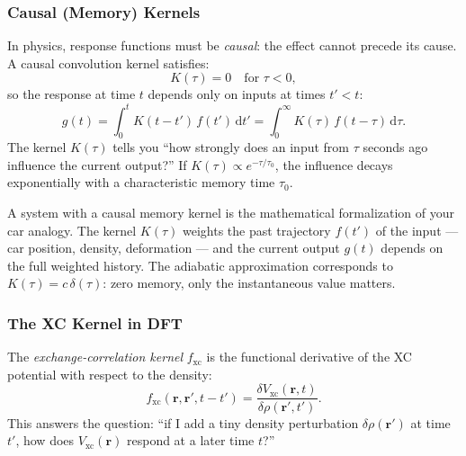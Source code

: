 \documentclass[12pt,letterpaper]{article}
\newcommand{\dd}{\mathrm{d}}
\newcommand{\Vxc}{V_{\mathrm{xc}}}
\newcommand{\fxc}{f_{\mathrm{xc}}}
\theoremstyle{definition}
\begin{document}
\subsubsection{Causal (Memory) Kernels}

In physics, response functions must be \emph{causal}: the effect cannot
precede its cause.  A causal convolution kernel satisfies:
\begin{equation}
  K(\tau) = 0 \quad\text{for } \tau < 0,
  \label{eq:causal}
\end{equation}
so the response at time $t$ depends only on inputs at times $t'<t$:
\begin{equation}
  g(t) = \int_0^t K(t-t')\,f(t')\,\dd t'
  = \int_0^\infty K(\tau)\,f(t-\tau)\,\dd\tau.
  \label{eq:causal_conv}
\end{equation}
The kernel $K(\tau)$ tells you ``how strongly does an input from $\tau$
seconds ago influence the current output?''  If $K(\tau)\propto e^{-\tau/\tau_0}$,
the influence decays exponentially with a characteristic memory time
$\tau_0$.

\begin{insight}
A system with a causal memory kernel is the mathematical formalization
of your car analogy.  The kernel $K(\tau)$ weights the past trajectory
$f(t')$ of the input --- car position, density, deformation --- and the
current output $g(t)$ depends on the full weighted history.  The
adiabatic approximation corresponds to $K(\tau)=c\,\delta(\tau)$: zero
memory, only the instantaneous value matters.
\end{insight}

\subsubsection{The XC Kernel in DFT}

The \emph{exchange-correlation kernel} $\fxc$ is the functional
derivative of the XC potential with respect to the density:
\begin{equation}
  \fxc(\bm{r},\bm{r}',t-t')
  = \frac{\delta\Vxc(\bm{r},t)}{\delta\rho(\bm{r}',t')}.
  \label{eq:fxc_kernel}
\end{equation}
This answers the question: ``if I add a tiny density perturbation
$\delta\rho(\bm{r}')$ at time $t'$, how does $\Vxc(\bm{r})$ respond at
a later time $t$?''
\end{document}
